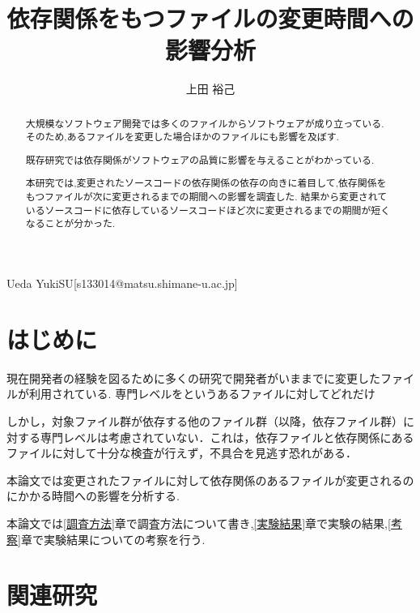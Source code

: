 \documentclass[submit,ses,noauthor]{ipsj} %
\begin{document}
\title{依存関係をもつファイルの変更時間への影響分析}

\etitle{}



\author{上田 裕己}{Ueda Yuki}{SU}[s133014@matsu.shimane-u.ac.jp]

\begin{abstract}
大規模なソフトウェア開発では多くのファイルからソフトウェアが成り立っている.
そのため,あるファイルを変更した場合ほかのファイルにも影響を及ぼす.

既存研究では依存関係がソフトウェアの品質に影響を与えることがわかっている.

本研究では,変更されたソースコードの依存関係の依存の向きに着目して,依存関係をもつファイルが次に変更されるまでの期間への影響を調査した.
  結果から変更されているソースコードに依存しているソースコードほど次に変更されるまでの期間が短くなることが分かった.
  

\end{abstract}

\maketitle

\section{はじめに} 
現在開発者の経験を図るために多くの研究で開発者がいままでに変更したファイルが利用されている.
専門レベルをというあるファイルに対してどれだけ


しかし，対象ファイル群が依存する他のファイル群（以降，依存ファイル群）に対する専門レベルは考慮されていない．これは，依存ファイルと依存関係にあるファイルに対して十分な検査が行えず，不具合を見逃す恐れがある．



本論文では変更されたファイルに対して依存関係のあるファイルが変更されるのにかかる時間への影響を分析する.


本論文では\ref{調査方法}章で調査方法について書き,\ref{実験結果}章で実験の結果,\ref{考察}章で実験結果についての考察を行う.

\section{関連研究}
\end{document}
